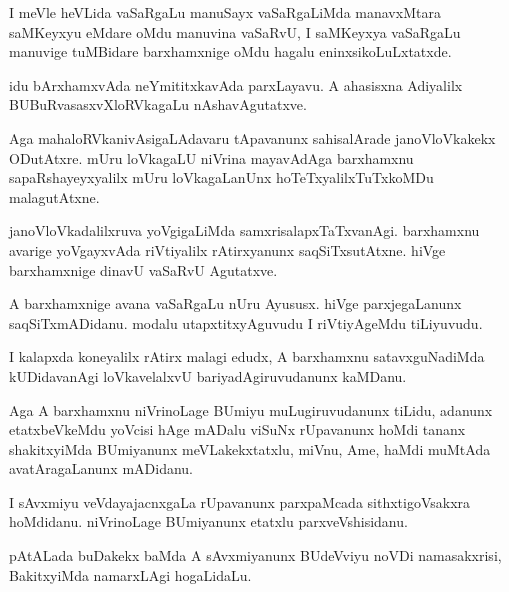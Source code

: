 \documentclass{article}
\begin{document}
\begin{mn}
I meVle heVLida vaSaRgaLu manuSayx vaSaRgaLiMda manavxMtara saMKeyxyu
eMdare oMdu manuvina vaSaRvU, I saMKeyxya vaSaRgaLu manuvige tuMBidare
barxhamxnige oMdu hagalu eninxsikoLuLxtatxde.
\end{mn}

\begin{mn}%
idu bArxhamxvAda neYmititxkavAda parxLayavu. A ahasisxna Adiyalilx
BUBuRvasasxvXloRVkagaLu nAshavAgutatxve.
\end{mn}

\begin{mn}
Aga mahaloRVkanivAsigaLAdavaru tApavanunx sahisalArade janoVloVkakekx
ODutAtxre. mUru loVkagaLU niVrina mayavAdAga barxhamxnu
sapaRshayeyxyalilx mUru loVkagaLanUnx hoTeTxyalilxTuTxkoMDu malagutAtxne.
\end{mn}

\begin{mn}%
janoVloVkadalilxruva yoVgigaLiMda samxrisalapxTaTxvanAgi. barxhamxnu
avarige yoVgayxvAda riVtiyalilx rAtirxyanunx saqSiTxsutAtxne. hiVge
barxhamxnige dinavU vaSaRvU Agutatxve.
\end{mn}

\begin{mn}
A barxhamxnige avana vaSaRgaLu nUru Ayususx. hiVge parxjegaLanunx
saqSiTxmADidanu. modalu utapxtitxyAguvudu I riVtiyAgeMdu tiLiyuvudu.
\end{mn}

\begin{mn}
I kalapxda koneyalilx rAtirx malagi edudx, A barxhamxnu
satavxguNadiMda kUDidavanAgi loVkavelalxvU bariyadAgiruvudanunx kaMDanu.
\end{mn}

\begin{mn}%
Aga A barxhamxnu niVrinoLage BUmiyu muLugiruvudanunx tiLidu, adanunx
etatxbeVkeMdu yoVcisi hAge mADalu viSuNx rUpavanunx hoMdi tananx
shakitxyiMda BUmiyanunx meVLakekxtatxlu, miVnu, Ame, haMdi muMtAda
avatAragaLanunx mADidanu.
\end{mn}

\begin{mn}
I sAvxmiyu veVdayajacnxgaLa rUpavanunx parxpaMcada sithxtigoVsakxra
hoMdidanu. niVrinoLage BUmiyanunx etatxlu parxveVshisidanu.
\end{mn}

\begin{mn}%
pAtALada buDakekx baMda A sAvxmiyanunx BUdeVviyu noVDi namasakxrisi,
BakitxyiMda namarxLAgi hogaLidaLu.
\end{mn}
\end{document}
